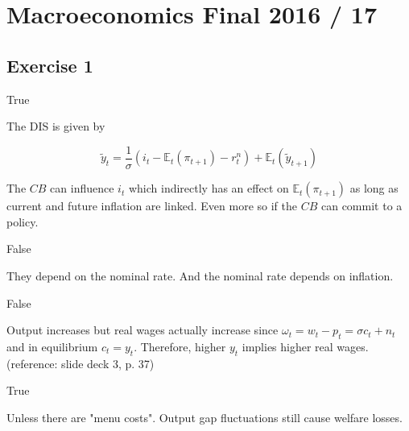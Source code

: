 \section{Macroeconomics Final 2016 / 17}

{
\subsection*{Exercise 1}

\begin{enumerate}[label=(\alph*)]
{\item 
True

The DIS is given by

$$
\tilde{y}_{t}=\frac{1}{\sigma}\left(i_{t}-\mathbb{E}_{t}\left(\pi_{t+1}\right)-r_{t}^n\right)+\mathbb{E}_{t}\left(\tilde{y}_{t+1}\right)
$$

The $C B$ can influence $i_t$ which indirectly has an effect on $\mathbb{E}_{t}\left(\pi_{t+1}\right)$ as long as current and future inflation are linked. Even more so if the $C B$ can commit to a policy.
}
{
\item 
False

They depend on the nominal rate. And the nominal rate depends on inflation.
}
{
\item 
False 

Output increases but real wages actually increase since $\omega_{t}=w_{t}-p_{t}=\sigma c_{t}+n_{t}$ and in equilibrium $c_{t}=y_{t}$. Therefore, higher $y_{t}$ implies higher real wages. (reference: slide deck 3, p. 37)
}
{
\item 
True

Unless there are "menu costs". Output gap fluctuations still cause welfare losses.
}
\end{enumerate}
}
